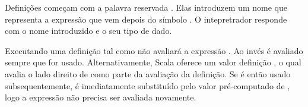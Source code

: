 Definições começam com a palavra reservada . Elas introduzem um nome
que representa a expressão que vem depois do símbolo \code{=}. O intepretrador
responde com o nome introduzido e o seu tipo de dado.



Executando uma definição tal como  não avaliará a expressão . 
Ao invés  é avaliado sempre que  for usado. Alternativamente, Scala 
oferece um valor definição , o qual avalia o lado direito de 
como parte da avaliação da definição. Se  é então usado subsequentemente, é 
imediatamente substituído pelo valor pré-computado de , logo a expressão não 
precisa ser avaliada novamente.





